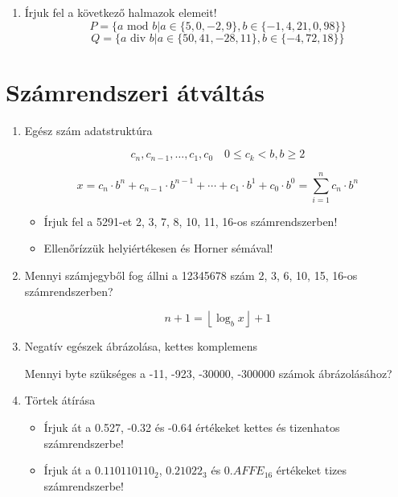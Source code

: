 \documentclass[a4paper]{article}
\begin{document}
\begin{enumerate}
\item

Írjuk fel a következő halmazok elemeit!
$$
P = \{a \text{ mod } b | a \in \{5, 0, -2, 9\}, b \in \{-1, 4, 21, 0, 98\}\}
$$
$$
Q = \{a \text{ div } b | a \in \{50, 41, -28, 11\}, b \in \{-4, 72, 18\}\}
$$

\end{enumerate}

\section*{Számrendszeri átváltás}

\begin{enumerate}

\item

Egész szám adatstruktúra

$$
c_n, c_{n-1}, \ldots, c_1, c_0 \quad 0 \leq c_k < b, b \geq 2
$$

$$
x = c_n \cdot b^n + c_{n-1} \cdot b^{n-1} + \cdots + c_1 \cdot b^1 + c_0 \cdot b^0 = \sum_{i=1}^n c_n \cdot b^n
$$

\begin{itemize}
	\item Írjuk fel a 5291-et 2, 3, 7, 8, 10, 11, 16-os számrendszerben!
	\item Ellenőrízzük helyiértékesen és Horner sémával!
\end{itemize}

\item

Mennyi számjegyből fog állni a 12345678 szám 2, 3, 6, 10, 15, 16-os számrendszerben?

$$
n + 1 = \left\lfloor \log_b x \right\rfloor + 1
$$

\item

Negatív egészek ábrázolása, kettes komplemens

Mennyi byte szükséges a -11, -923, -30000, -300000 számok ábrázolásához?

\item

Törtek átírása
\begin{itemize}
	\item Írjuk át a 0.527, -0.32 és -0.64 értékeket kettes és tizenhatos számrendszerbe!
	\item Írjuk át a $0.110110110_2$, $0.21022_3$ és $0.AFFE_{16}$ értékeket tizes számrendszerbe!
\end{itemize}


\end{enumerate}
\end{document}
